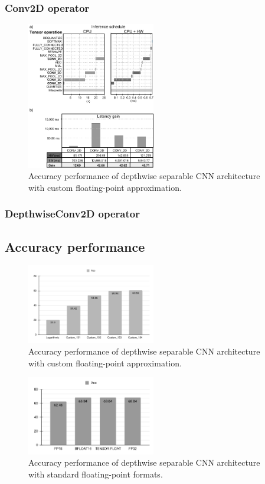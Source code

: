 \subsubsection{Conv2D operator}
\begin{figure}[t!]
	\centering
	\includegraphics[width=0.5\textwidth]{../figures/performance_fixed_point_small.pdf}
	\caption{Accuracy performance of depthwise separable CNN architecture with custom floating-point approximation.}
	\label{fig:fixed_point}
\end{figure}
\subsubsection{DepthwiseConv2D operator}
\subsection{Accuracy performance}


\begin{figure}[t!]
	\centering
	\includegraphics[width=0.5\textwidth]{../figures/acc_depthwise_cifar_custom.pdf}
	\caption{Accuracy performance of depthwise separable CNN architecture with custom floating-point approximation.}
	\label{fig:acc_custom}
\end{figure}

\begin{figure}[t!]
	\centering
	\includegraphics[width=0.5\textwidth]{../figures/acc_depthwise_cifar_standard.pdf}
	\caption{Accuracy performance of depthwise separable CNN architecture with standard floating-point formats.}
	\label{fig:acc_standard}
\end{figure}